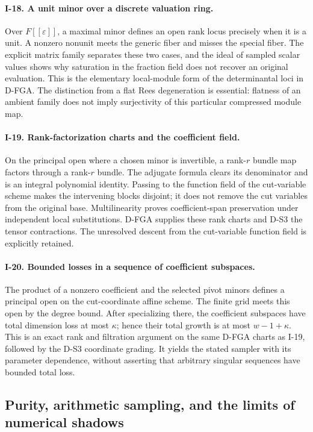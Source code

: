 \documentclass[11pt,a4paper]{article}
\theoremstyle{definition}\newtheorem{definition}{Definition}
\begin{document}
\paragraph{I-18. A unit minor over a discrete valuation ring.}
Over $F[[\varepsilon]]$, a maximal minor defines an open rank locus precisely when it is a unit. A nonzero nonunit meets the generic fiber and misses the special fiber. The explicit matrix family separates these two cases, and the ideal of sampled scalar values shows why saturation in the fraction field does not recover an original evaluation. This is the elementary local-module form of the determinantal loci in D-FGA. The distinction from a flat Rees degeneration is essential: flatness of an ambient family does not imply surjectivity of this particular compressed module map.

\paragraph{I-19. Rank-factorization charts and the coefficient field.}
On the principal open where a chosen minor is invertible, a rank-$r$ bundle map factors through a rank-$r$ bundle. The adjugate formula clears its denominator and is an integral polynomial identity. Passing to the function field of the cut-variable scheme makes the intervening blocks disjoint; it does not remove the cut variables from the original base. Multilinearity proves coefficient-span preservation under independent local substitutions. D-FGA supplies these rank charts and D-S3 the tensor contractions. The unresolved descent from the cut-variable function field is explicitly retained.

\paragraph{I-20. Bounded losses in a sequence of coefficient subspaces.}
The product of a nonzero coefficient and the selected pivot minors defines a principal open on the cut-coordinate affine scheme. The finite grid meets this open by the degree bound. After specializing there, the coefficient subspaces have total dimension loss at most $\kappa$; hence their total growth is at most $w-1+\kappa$. This is an exact rank and filtration argument on the same D-FGA charts as I-19, followed by the D-S3 coordinate grading. It yields the stated sampler with its parameter dependence, without asserting that arbitrary singular sequences have bounded total loss.

\subsection{Purity, arithmetic sampling, and the limits of numerical shadows}
\end{document}
